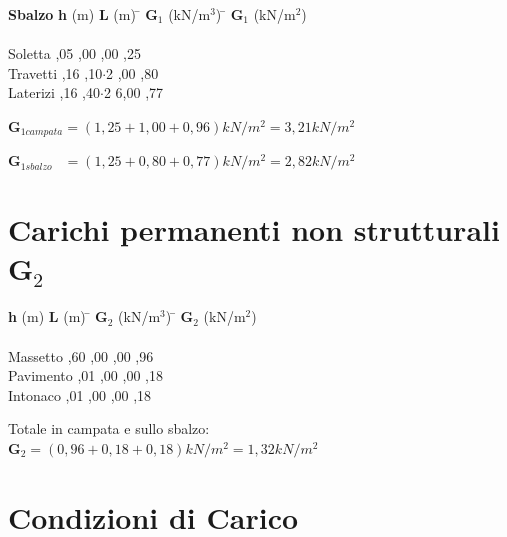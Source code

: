 \documentclass[a4paper,12pt, oneside]{book}
\begin{document}
	\begin{tabbing}
		\textbf{Sbalzo}\phantom{11.} \hspace{2em} \= \textbf{h} (m)\hspace{3em} \= \textbf{L} (m)\hspace{3em} \= $\textbf{G}_1$ (kN/m$^3$)\hspace{3em} \= $\textbf{G}_1$ (kN/m$^2$)\hspace{1em}\\\\
		Soletta  ,05 ,00           ,00           ,25  \\
		Travetti \> 0,16 ,10$\cdot$2   ,00           ,80  \\ 
		Laterizi \> 0,16 ,40$\cdot$2 \> \phantom{0}6,00   ,77                                    
	\end{tabbing}

    \phantom{123}$\textbf{G}_{1campata}=(1,25+1,00+0,96)kN/m^2=3,21kN/m^2$ 
	
	\phantom{123}$\textbf{G}_{1sbalzo}\phantom{1.}=(1,25+0,80+0,77)kN/m^2=2,82kN/m^2$

    \section{Carichi permanenti non strutturali $\textbf{G}_2$}
    
    \begin{tabbing}
    	\hspace{2em} \= \textbf{h} (m)\hspace{3em} \= \textbf{L} (m)\hspace{3em} \= $\textbf{G}_2$ (kN/m$^3$)\hspace{3em} \= $\textbf{G}_2$ (kN/m$^2$)\hspace{1em}\\\\
    	Massetto  ,60 ,00 ,00           ,96  \\
    	Pavimento ,01 ,00 ,00           ,18  \\ 
    	Intonaco  ,01 ,00 ,00           ,18                                    
    \end{tabbing}    
    
    Totale in campata e sullo sbalzo:\\
    \phantom{123}$\textbf{G}_2=(0,96+0,18+0,18)kN/m^2=1,32kN/m^2$ 
    
    \section{Condizioni di Carico}
    
\end{document}
